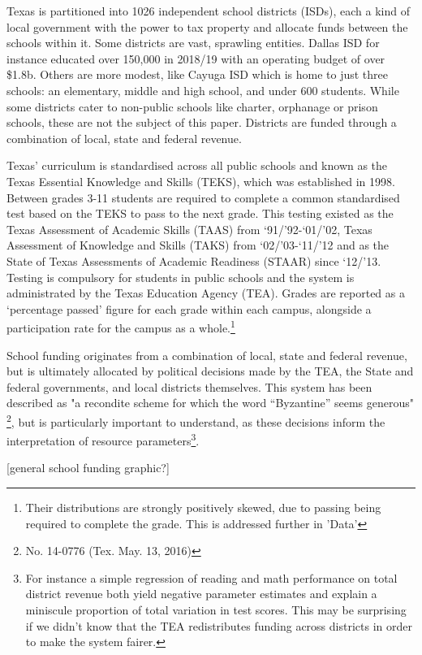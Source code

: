 \documentclass[11pt]{article}
\begin{document}
Texas is partitioned into 1026 independent school districts (ISDs), each a kind of local government with the power to tax property and allocate funds between the schools within it. Some districts are vast, sprawling entities. Dallas ISD for instance educated over 150,000 in 2018/19 with an operating budget of over \$1.8b. Others are more modest, like Cayuga ISD which is home to just three schools: an elementary, middle and high school, and under 600 students. While some districts cater to non-public schools like charter, orphanage or prison schools, these are not the subject of this paper. Districts are funded through a combination of local, state and federal revenue. 

Texas’ curriculum is standardised across all public schools and known as the Texas Essential Knowledge and Skills (TEKS), which was established in 1998. Between grades 3-11 students are required to complete a common standardised test based on the TEKS to pass to the next grade. This testing existed as the Texas Assessment of Academic Skills (TAAS) from ‘91/’92-‘01/’02, Texas Assessment of Knowledge and Skills (TAKS) from ‘02/’03-‘11/’12 and as the State of Texas Assessments of Academic Readiness (STAAR) since ‘12/’13. Testing is compulsory for students in public schools and the system is administrated by the Texas Education Agency (TEA). Grades are reported as a ‘percentage passed’ figure for each grade within each campus, alongside a participation rate for the campus as a whole.\footnote{Their distributions are strongly positively skewed, due to passing being required to complete the grade. This is addressed further in 'Data'} 

School funding originates from a combination of local, state and federal revenue, but is ultimately allocated by political decisions made by the TEA, the State and federal governments, and local districts themselves. This system has been described as "a recondite scheme for which the word “Byzantine” seems generous" \footnote{No. 14-0776 (Tex. May. 13, 2016)}, but is particularly important to understand, as these decisions inform the interpretation of resource parameters\footnote{For instance a simple regression of reading and math performance on total district revenue both yield negative parameter estimates and explain a miniscule proportion of total variation in test scores. This may be surprising if we didn’t know that the TEA redistributes funding across districts in order to make the system fairer.}. 

[general school funding graphic?]
\end{document}
